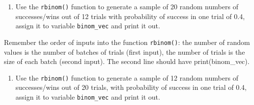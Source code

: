 \documentclass[
  letterpaper,
  DIV=11,
  numbers=noendperiod]{scrreprt}
\newenvironment{Shaded}{\begin{snugshade}}{\end{snugshade}}
\providecommand{\tightlist}{%
  \setlength{\itemsep}{0pt}\setlength{\parskip}{0pt}}\usepackage{longtable,booktabs,array}
\begin{document}
\begin{enumerate}
\def\labelenumi{\arabic{enumi}.}
\setcounter{enumi}{2}
\tightlist
\item
  Use the \texttt{rbinom()} function to generate a sample of 20 random
  numbers of successes/wins out of 12 trials with probability of success
  in one trial of 0.4, assign it to variable \texttt{binom\_vec} and
  print it out.
\end{enumerate}

\begin{Shaded}
\begin{Highlighting}[]

\end{Highlighting}
\end{Shaded}

\begin{tcolorbox}[enhanced jigsaw, arc=.35mm, colframe=quarto-callout-caution-color-frame, left=2mm, opacitybacktitle=0.6, breakable, title=\textcolor{quarto-callout-caution-color}{\faFire}\hspace{0.5em}{Hint}, toprule=.15mm, coltitle=black, bottomtitle=1mm, toptitle=1mm, colback=white, leftrule=.75mm, colbacktitle=quarto-callout-caution-color!10!white, titlerule=0mm, opacityback=0, rightrule=.15mm, bottomrule=.15mm]

Remember the order of inputs into the function \texttt{rbinom()}: the
number of random values is the number of batches of trials (first
input), the number of trials is the size of each batch (second input).
The second line should have print(binom\_vec).

\end{tcolorbox}

\begin{enumerate}
\def\labelenumi{\arabic{enumi}.}
\setcounter{enumi}{3}
\tightlist
\item
  Use the \texttt{rbinom()} function to generate a sample of 12 random
  numbers of successes/wins out of 20 trials, with probability of
  success in one trial of 0.4, assign it to variable \texttt{binom\_vec}
  and print it out.
\end{enumerate}

\begin{Shaded}
\begin{Highlighting}[]

\end{Highlighting}
\end{Shaded}
\end{document}
